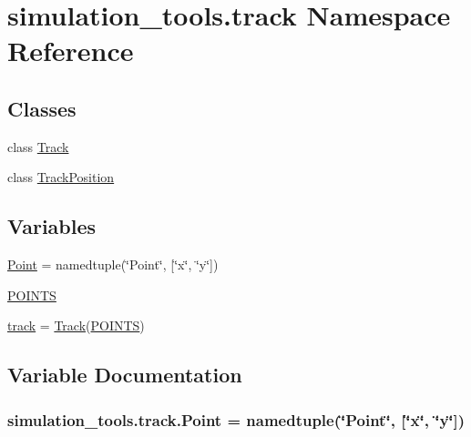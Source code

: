 \hypertarget{namespacesimulation__tools_1_1track}{}\section{simulation\+\_\+tools.\+track Namespace Reference}
\label{namespacesimulation__tools_1_1track}
\subsection*{Classes}
\begin{DoxyCompactItemize}
\item 
class \hyperlink{classsimulation__tools_1_1track_1_1_track}{Track}
\item 
class \hyperlink{classsimulation__tools_1_1track_1_1_track_position}{Track\+Position}
\end{DoxyCompactItemize}
\subsection*{Variables}
\begin{DoxyCompactItemize}
\item 
\hyperlink{namespacesimulation__tools_1_1track_a927c1793846ca41f328e4b427075cafd}{Point} = namedtuple(\char`\"{}Point\char`\"{}, \mbox{[}\char`\"{}x\char`\"{}, \char`\"{}y\char`\"{}\mbox{]})
\item 
\hyperlink{namespacesimulation__tools_1_1track_ab9ddc4d3ba8bb81a3ce02320f46c8a55}{P\+O\+I\+N\+TS}
\item 
\hyperlink{namespacesimulation__tools_1_1track_ac731095c2502c445d46302406cb81651}{track} = \hyperlink{classsimulation__tools_1_1track_1_1_track}{Track}(\hyperlink{namespacesimulation__tools_1_1track_ab9ddc4d3ba8bb81a3ce02320f46c8a55}{P\+O\+I\+N\+TS})
\end{DoxyCompactItemize}


\subsection{Variable Documentation}
\subsubsection[{\texorpdfstring{Point}{Point}}]{\setlength{\rightskip}{0pt plus 5cm}simulation\+\_\+tools.\+track.\+Point = namedtuple(\char`\"{}Point\char`\"{}, \mbox{[}\char`\"{}x\char`\"{}, \char`\"{}y\char`\"{}\mbox{]})}\hypertarget{namespacesimulation__tools_1_1track_a927c1793846ca41f328e4b427075cafd}{}\label{namespacesimulation__tools_1_1track_a927c1793846ca41f328e4b427075cafd}


